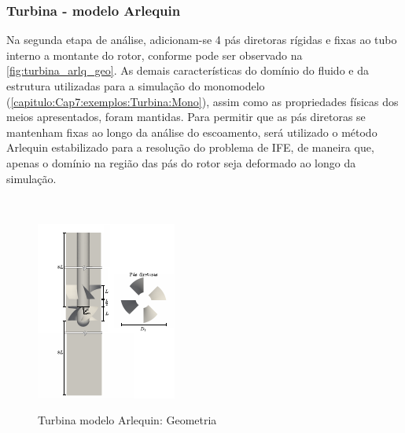 \begin{figure}[!htbp]
	\label{fig:turbina_mono_press}
\end{figure}


\subsubsection{Turbina - modelo Arlequin}

Na segunda etapa de análise, adicionam-se 4 pás diretoras rígidas e fixas ao tubo interno a montante do rotor, conforme pode ser observado na \autoref{fig:turbina_arlq_geo}. As demais características do domínio do fluido e da estrutura utilizadas para a simulação do monomodelo (\autoref{capitulo:Cap7:exemplos:Turbina:Mono}), assim como as propriedades físicas dos meios apresentados, foram mantidas. Para permitir que as pás diretoras se mantenham fixas ao longo da análise do escoamento, será utilizado o método Arlequin estabilizado para a resolução do problema de IFE, de maneira que, apenas o domínio na região das pás do rotor seja deformado ao longo da simulação.

\

\begin{figure}[!htbp]
	\caption{Turbina modelo Arlequin: Geometria}
	\centering 
	\includegraphics[scale=3.0,trim=0cm 0cm 0cm 0cm, clip=true]{Imagens/Cap7/turbina_arlq_geo.pdf}	
	\label{fig:turbina_arlq_geo}
\end{figure}

